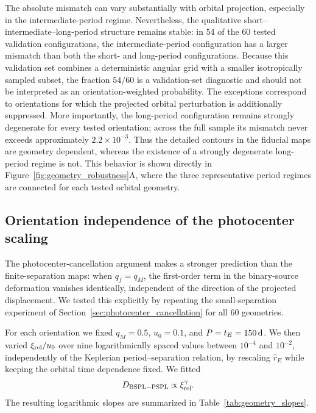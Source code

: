 \documentclass{article}
\begin{document}
The absolute mismatch can vary substantially with orbital projection,
especially in the intermediate-period regime. Nevertheless, the
qualitative short--intermediate--long-period structure remains stable:
in 54 of the 60 tested validation configurations, the
intermediate-period configuration has a larger mismatch than both the
short- and long-period configurations. Because this validation set
combines a deterministic angular grid with a smaller isotropically
sampled subset, the fraction $54/60$ is a validation-set diagnostic and
should not be interpreted as an orientation-weighted probability. The
exceptions correspond to orientations for which the projected orbital
perturbation is additionally suppressed. More importantly, the long-period configuration remains
strongly degenerate for every tested orientation; across the full
sample its mismatch never exceeds approximately
$2.2\times10^{-3}$. Thus the detailed contours in the fiducial maps are
geometry dependent, whereas the existence of a strongly degenerate
long-period regime is not. This behavior is shown directly in
Figure~\ref{fig:geometry_robustness}A, where the three representative
period regimes are connected for each tested orbital geometry.

\subsection{Orientation independence of the photocenter scaling}

The photocenter-cancellation argument makes a stronger prediction than
the finite-separation maps: when $q_f=q_M$, the first-order term in the
binary-source deformation vanishes identically, independent of the
direction of the projected displacement. We tested this explicitly by
repeating the small-separation experiment of
Section~\ref{sec:photocenter_cancellation} for all 60 geometries.

For each orientation we fixed
$q_M=0.5$, $u_0=0.1$, and $P=t_E=150\,{\rm d}$. We then varied
$\xi_{\rm rel}/u_0$ over nine logarithmically spaced values between
$10^{-4}$ and $10^{-2}$, independently of the Keplerian
period--separation relation, by rescaling $\hat r_E$ while keeping the
orbital time dependence fixed. We fitted
\begin{equation}
D_{\rm BSPL-PSPL}\propto\xi_{\rm rel}^{\gamma}.
\end{equation}
The resulting logarithmic slopes are summarized in
Table~\ref{tab:geometry_slopes}.
\end{document}
